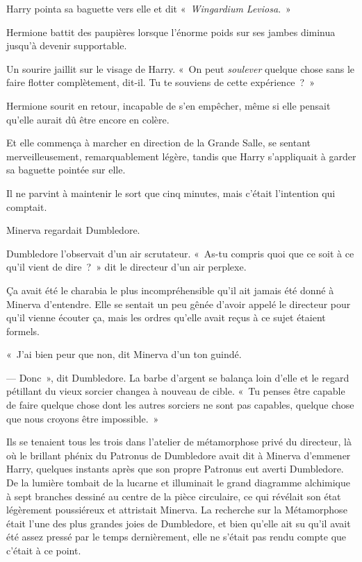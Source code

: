Harry pointa sa baguette vers elle et dit «~\emph{Wingardium Leviosa}.~»

Hermione battit des paupières lorsque l'énorme poids sur ses jambes diminua jusqu'à devenir supportable.

Un sourire jaillit sur le visage de Harry.
«~On peut \emph{soulever} quelque chose sans le faire flotter complètement, dit-il.
Tu te souviens de cette expérience~?~»

Hermione sourit en retour, incapable de s'en empêcher, même si elle pensait qu'elle aurait dû être encore en colère.

Et elle commença à marcher en direction de la Grande Salle, se sentant merveilleusement, remarquablement légère, tandis que Harry s'appliquait à garder sa baguette pointée sur elle.

Il ne parvint à maintenir le sort que cinq minutes, mais c'était l'intention qui comptait.

\later

Minerva regardait Dumbledore.

Dumbledore l'observait d'un air scrutateur.
«~As-tu compris quoi que ce soit à ce qu'il vient de dire~?~»
dit le directeur d'un air perplexe.

Ça avait été le charabia le plus incompréhensible qu'il ait jamais été donné à Minerva d'entendre.
Elle se sentait un peu gênée d'avoir appelé le directeur pour qu'il vienne écouter ça, mais les ordres qu'elle avait reçus à ce sujet étaient formels.

«~J'ai bien peur que non, dit Minerva d'un ton guindé.

--- Donc~», dit Dumbledore.
La barbe d'argent se balança loin d'elle et le regard pétillant du vieux sorcier changea à nouveau de cible.
«~Tu penses être capable de faire quelque chose dont les autres sorciers ne sont pas capables, quelque chose que nous croyons être impossible.~»

Ils se tenaient tous les trois dans l'atelier de métamorphose privé du directeur, là où le brillant phénix du Patronus de Dumbledore avait dit à Minerva d'emmener Harry, quelques instants après que son propre Patronus eut averti Dumbledore.
De la lumière tombait de la lucarne et illuminait le grand diagramme alchimique à sept branches dessiné au centre de la pièce circulaire, ce qui révélait son état légèrement poussiéreux et attristait Minerva.
La recherche sur la Métamorphose était l'une des plus grandes joies de Dumbledore, et bien qu'elle ait su qu'il avait été assez pressé par le temps dernièrement, elle ne s'était pas rendu compte que c'était à ce point.

